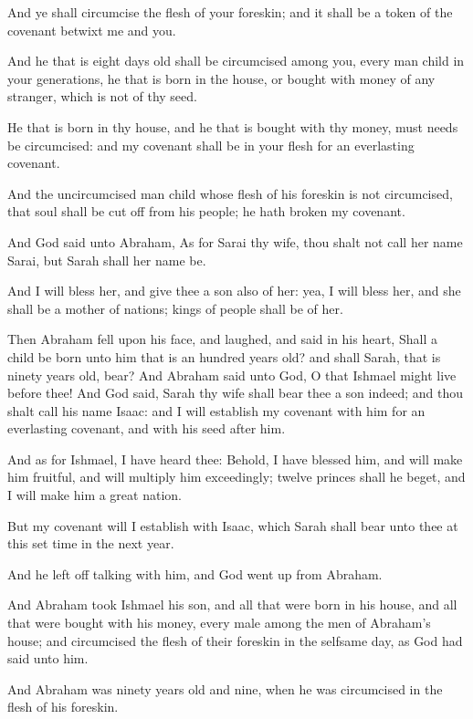 \verse And ye shall circumcise the flesh of your foreskin; and it shall
be a token of the covenant betwixt me and you.

\verse And he that is eight days old shall be circumcised among you,
every man child in your generations, he that is born in the house, or
bought with money of any stranger, which is not of thy seed.

\verse He that is born in thy house, and he that is bought with thy
money, must needs be circumcised: and my covenant shall be in your
flesh for an everlasting covenant.

\verse And the uncircumcised man child whose flesh of his foreskin is
not circumcised, that soul shall be cut off from his people; he hath
broken my covenant.

\verse And God said unto Abraham, As for Sarai thy wife, thou shalt not
call her name Sarai, but Sarah shall her name be.

\verse And I will bless her, and give thee a son also of her: yea, I
will bless her, and she shall be a mother of nations; kings of people
shall be of her.

\verse Then Abraham fell upon his face, and laughed, and said in his
heart, Shall a child be born unto him that is an hundred years old?
and shall Sarah, that is ninety years old, bear?  \verse And Abraham
said unto God, O that Ishmael might live before thee!  \verse And God
said, Sarah thy wife shall bear thee a son indeed; and thou shalt call
his name Isaac: and I will establish my covenant with him for an
everlasting covenant, and with his seed after him.

\verse And as for Ishmael, I have heard thee: Behold, I have blessed
him, and will make him fruitful, and will multiply him exceedingly;
twelve princes shall he beget, and I will make him a great nation.

\verse But my covenant will I establish with Isaac, which Sarah shall
bear unto thee at this set time in the next year.

\verse And he left off talking with him, and God went up from Abraham.

\verse And Abraham took Ishmael his son, and all that were born in his
house, and all that were bought with his money, every male among the
men of Abraham's house; and circumcised the flesh of their foreskin in
the selfsame day, as God had said unto him.

\verse And Abraham was ninety years old and nine, when he was
circumcised in the flesh of his foreskin.

